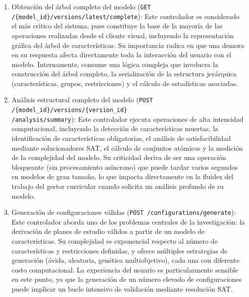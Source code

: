 \begin{enumerate}
    \item Obtención del árbol completo del modelo (\texttt{GET /\{model\_id\}/versions/latest/complete}): 
    Este controlador es considerado el más crítico del sistema, pues constituye la base de la mayoría de las 
    operaciones realizadas desde el cliente visual, incluyendo la representación gráfica del árbol de características. 
    Su importancia radica en que una demora en su respuesta afecta directamente toda la interacción del usuario 
    con el modelo. Internamente, consume una lógica compleja que involucra la construcción del árbol completo, 
    la serialización de la estructura jerárquica (características, grupos, restricciones) y el cálculo de 
    estadísticas asociadas.
    
    \item Análisis estructural completo del modelo (\texttt{POST /\{model\_id\}/versions/\{version\_id\} \\ /analysis/summary}): 
    Este controlador ejecuta operaciones de alta intensidad computacional, incluyendo la detección de características 
    muertas, la identificación de características obligatorias, el análisis de satisfacibilidad mediante solucionadores 
    \ac{SAT}, el cálculo de conjuntos atómicos y la medición de la complejidad del modelo. Su criticidad deriva de 
    ser una operación bloqueante (sin procesamiento asíncrono) que puede tardar varios segundos en modelos de gran 
    tamaño, lo que impacta directamente en la fluidez del trabajo del gestor curricular cuando solicita un análisis 
    profundo de su modelo.
    
    \item Generación de configuraciones válidas (\texttt{POST /configurations/generate}): 
    Este controlador aborda uno de los problemas centrales de la investigación: la derivación de planes de estudio 
    válidos a partir de un modelo de características. Su complejidad es exponencial respecto al número de 
    características y restricciones definidas, y ofrece múltiples estrategias de generación (ávida, aleatoria, 
    genética multiobjetivo), cada una con diferente costo computacional. La experiencia del usuario es 
    particularmente sensible en este punto, ya que la generación de un número elevado de configuraciones puede 
    implicar un bucle intensivo de validación mediante resolución \ac{SAT}.
    

\end{enumerate}
